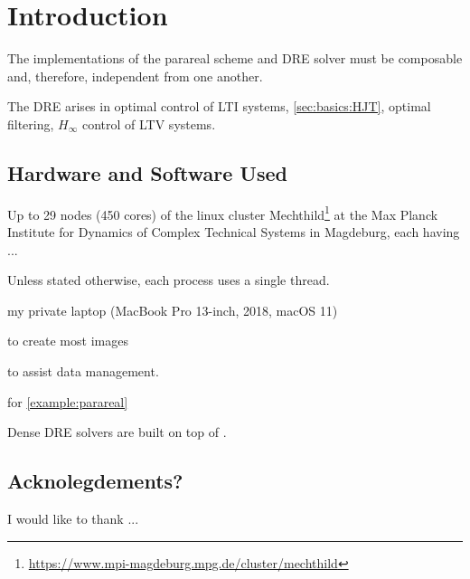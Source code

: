 \chapter{Introduction}

The implementations of the parareal scheme and \ac{DRE} solver must be composable and,
therefore, independent from one another.

The \ac{DRE} arises in \eg optimal control of \ac{LTI} systems, \cf \autoref{sec:basics:HJT},
optimal filtering, $H_\infty$ control of \ac{LTV} systems.

\section*{Hardware and Software Used}

Up to 29 nodes (450 cores) of the linux cluster Mechthild\footnote{\url{https://www.mpi-magdeburg.mpg.de/cluster/mechthild}}
at the Max Planck Institute for Dynamics of Complex Technical Systems in Magdeburg, each having ...

Unless stated otherwise, each process uses a single thread.

my private laptop (MacBook Pro 13-inch, 2018, macOS 11)

 \cite{Makie} to create most images

 \cite{DrWatson} to assist data management.

 \cite{DifferentialEquations} for \autoref{example:parareal}

Dense \ac{DRE} solvers are built on top of  \cite{MatrixEquations}.

\section*{Acknolegdements?}

I would like to thank ...
